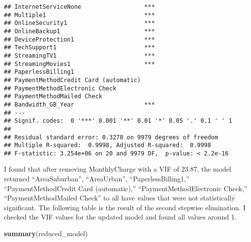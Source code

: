 \documentclass[
]{article}
\newenvironment{Shaded}{\begin{snugshade}}{\end{snugshade}}
\newcommand{\FunctionTok}[1]{\textcolor[rgb]{0.13,0.29,0.53}{\textbf{#1}}}
\newcommand{\NormalTok}[1]{#1}
\begin{document}
\begin{verbatim}
## InternetServiceNone                  ***
## Multiple1                            ***
## OnlineSecurity1                      ***
## OnlineBackup1                        ***
## DeviceProtection1                    ***
## TechSupport1                         ***
## StreamingTV1                         ***
## StreamingMovies1                     ***
## PaperlessBilling1                       
## PaymentMethodCredit Card (automatic)    
## PaymentMethodElectronic Check           
## PaymentMethodMailed Check               
## Bandwidth_GB_Year                    ***
## ---
## Signif. codes:  0 '***' 0.001 '**' 0.01 '*' 0.05 '.' 0.1 ' ' 1
## 
## Residual standard error: 0.3278 on 9979 degrees of freedom
## Multiple R-squared:  0.9998, Adjusted R-squared:  0.9998 
## F-statistic: 3.254e+06 on 20 and 9979 DF,  p-value: < 2.2e-16
\end{verbatim}

I found that after removing MonthlyCharge with a VIF of 23.87, the model
returned ``AreaSuburban'', ``AreaUrban'', ``PaperlessBilling1,''
``PaymentMethodCredit Card (automatic),'' ``PaymentMethodElectronic
Check,'' ``PaymentMethodMailed Check'' to all have values that were not
statistically significant. The following table is the result of the
second stepwise elimination. I checked the VIF values for the updated
model and found all values around 1.

\begin{Shaded}
\begin{Highlighting}[]
\FunctionTok{summary}\NormalTok{(reduced\_model)}
\end{Highlighting}
\end{Shaded}
\end{document}
